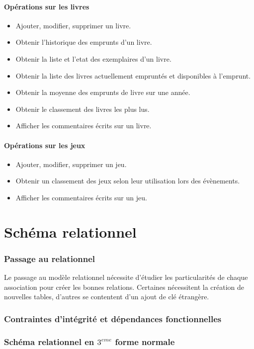 \documentclass[a4paper, 11pt]{article}
\begin{document}
\subsection{Opérations sur les livres}
\begin{itemize}
\item Ajouter, modifier, supprimer un livre.
\item Obtenir l'historique des emprunts d'un livre.
\item Obtenir la liste et l'etat des exemplaires d'un livre.
\item Obtenir la liste des livres actuellement empruntés et disponibles à l'emprunt.
\item Obtenir la moyenne des emprunts de livre sur une année.
\item Obtenir le classement des livres les plus lus.
\item Afficher les commentaires écrits sur un livre.
\end{itemize}
\subsection{Opérations sur les jeux}
\begin{itemize}
\item Ajouter, modifier, supprimer un jeu.
\item Obtenir un classement des jeux selon leur utilisation lors des évènements.
\item Afficher les commentaires écrits sur un jeu.
\end{itemize}

\newpage
\part{Schéma relationnel}
\setcounter{section}{0}
\section{Passage au relationnel}
Le passage au modèle relationnel nécessite d'étudier les particularités de chaque association pour créer les bonnes relations. Certaines nécessitent la création de nouvelles tables, d'autres se contentent d'un ajout de clé étrangère.
\section{Contraintes d'intégrité et dépendances fonctionnelles}
\section{Schéma relationnel en $3^{eme}$ forme normale}
\end{document}
